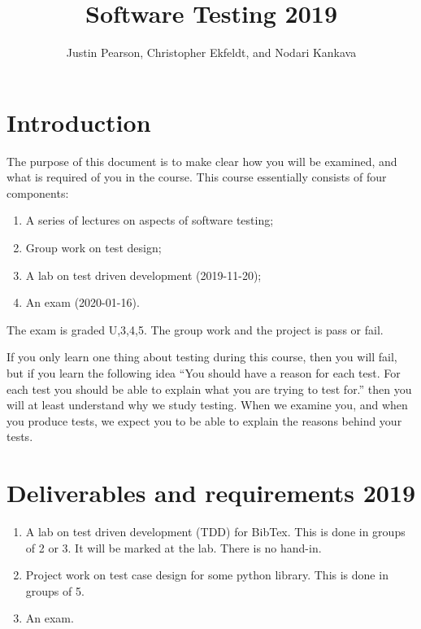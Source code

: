\documentclass[a4paper]{article}
\title{Software Testing 2019}
\author{Justin Pearson, Christopher Ekfeldt, and Nodari Kankava}
\begin{document}
\maketitle
\def\UrlBreaks{\do\/\do-} 

\section{Introduction}
The purpose of this document is to make clear how you will be examined, and
what is required of you in the course.  This course essentially consists of
four components:
\begin{enumerate}
\item A series of lectures on aspects of software testing;
\item Group work on test design;
\item A lab on test driven development (2019-11-20);
\item An exam (2020-01-16).
\end{enumerate}
The exam is graded U,3,4,5. The group work and the project is pass or fail.

If you only learn one thing about testing during this course, then you
will fail, but if you learn the following idea ``You should have a
reason for each test. For each test you should be able to explain what
you are trying to test for.'' then you will at least understand why we
study testing. When we examine you, and when you produce tests, we
expect you to be able to explain the reasons behind your tests.


\section{Deliverables and requirements  2019}



\begin{enumerate}
\item A lab on  test driven development (TDD) for  BibTex.   This is
  done in groups of 2 or 3. It will be marked at the lab. There is no
  hand-in. 

\item Project work on test case design for some python library. This
  is done in groups of 5.
\item An exam.

  \end{enumerate}
\end{document}
